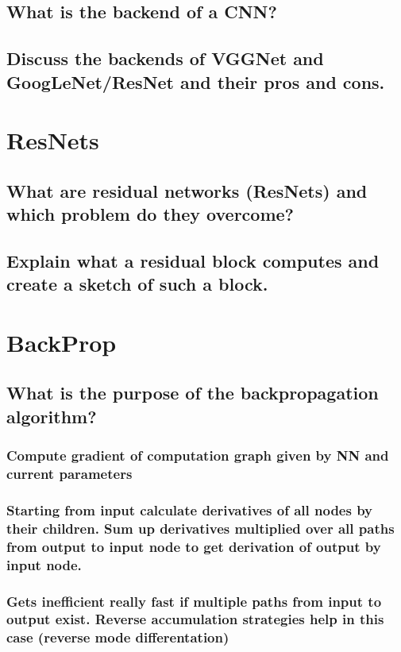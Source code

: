 \subsection{What is the backend of a CNN?}

\subsection{Discuss the backends of VGGNet and GoogLeNet/ResNet and their pros and cons.}

\section{ResNets}

\subsection{What are residual networks (ResNets) and which problem do they overcome?}

\subsection{Explain what a residual block computes and create a sketch of such a block.}

\section{BackProp}

\subsection{What is the purpose of the backpropagation algorithm?}

\subsubsection{ Compute gradient of computation graph given by NN and current parameters}

\subsubsection{ Starting from input calculate derivatives of all nodes by their children. Sum up derivatives multiplied over all paths from output to input node to get derivation of output by input node. }

\subsubsection{ Gets inefficient really fast if multiple paths from input to output exist. Reverse accumulation strategies help in this case (reverse mode differentation)}

